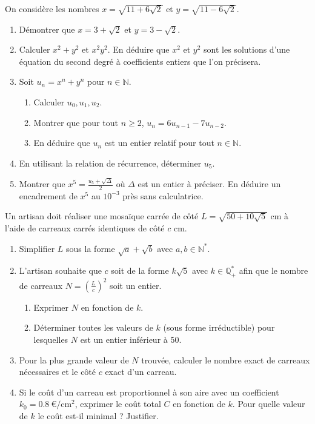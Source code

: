 \documentclass[11pt]{article}
\begin{document}
\begin{exercice}
On considère les nombres $x = \sqrt{11 + 6\sqrt{2}}$ et $y = \sqrt{11 - 6\sqrt{2}}$.
\begin{enumerate}
    \item Démontrer que $x = 3 + \sqrt{2}$ et $y = 3 - \sqrt{2}$.
    \item Calculer $x^2 + y^2$ et $x^2y^2$. En déduire que $x^2$ et $y^2$ sont les solutions d'une équation du second degré à coefficients entiers que l'on précisera.
    \item Soit $u_n = x^n + y^n$ pour $n \in \mathbb{N}$.
    \begin{enumerate}
        \item Calculer $u_0, u_1, u_2$.
        \item Montrer que pour tout $n \geq 2$, $u_{n} = 6u_{n-1} - 7u_{n-2}$.
        \item En déduire que $u_n$ est un entier relatif pour tout $n \in \mathbb{N}$.
    \end{enumerate}
    \item En utilisant la relation de récurrence, déterminer $u_5$.
    \item Montrer que $x^5 = \frac{u_5 + \sqrt{\Delta}}{2}$ où $\Delta$ est un entier à préciser. En déduire un encadrement de $x^5$ au $10^{-3}$ près sans calculatrice.
\end{enumerate}
\end{exercice}

\begin{exercice}
Un artisan doit réaliser une mosaïque carrée de côté $L = \sqrt{50 + 10\sqrt{5}}$ cm à l'aide de carreaux carrés identiques de côté $c$ cm.
\begin{enumerate}
    \item Simplifier $L$ sous la forme $\sqrt{a} + \sqrt{b}$ avec $a,b \in \mathbb{N}^*$.
    \item L'artisan souhaite que $c$ soit de la forme $k\sqrt{5}$ avec $k \in \mathbb{Q}^*_+$ afin que le nombre de carreaux $N = \left(\frac{L}{c}\right)^2$ soit un entier.
    \begin{enumerate}
        \item Exprimer $N$ en fonction de $k$.
        \item Déterminer toutes les valeurs de $k$ (sous forme irréductible) pour lesquelles $N$ est un entier inférieur à 50.
    \end{enumerate}
    \item Pour la plus grande valeur de $N$ trouvée, calculer le nombre exact de carreaux nécessaires et le côté $c$ exact d'un carreau.
    \item Si le coût d'un carreau est proportionnel à son aire avec un coefficient $k_0 = \SI{0,8}{\euro\per\centi\meter\squared}$, exprimer le coût total $C$ en fonction de $k$. Pour quelle valeur de $k$ le coût est-il minimal ? Justifier.
\end{enumerate}
\end{exercice}
\end{document}

